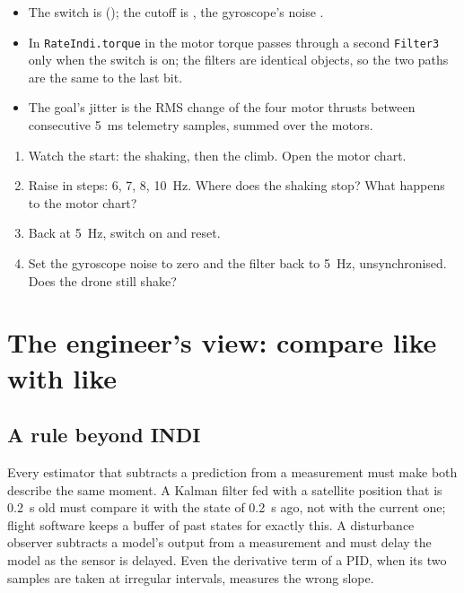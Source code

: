 \begin{inapp}
\begin{itemize}[leftmargin=1.2em]
  \item The switch is  (); the cutoff is , the gyroscope's noise .
  \item In \texttt{RateIndi.torque} in  the motor torque passes through a second \texttt{Filter3} only when the switch is on; the filters are identical objects, so the two paths are the same to the last bit.
  \item The goal's jitter is the RMS change of the four motor thrusts between consecutive \SI{5}{ms} telemetry samples, summed over the motors.
\end{itemize}
\end{inapp}

\begin{trythis}
\begin{enumerate}
  \item Watch the start: the shaking, then the climb. Open the motor chart.
  \item Raise  in steps: 6, 7, 8, \SI{10}{Hz}. Where does the shaking stop? What happens to the motor chart?
  \item Back at \SI{5}{Hz}, switch  on and reset.
  \item Set the gyroscope noise to zero and the filter back to \SI{5}{Hz}, unsynchronised. Does the drone still shake?
\end{enumerate}
\end{trythis}

\section{The engineer's view: compare like with like}

\subsection{A rule beyond INDI}
Every estimator that subtracts a prediction from a measurement must make both describe the same moment. A Kalman filter fed with a satellite position that is \SI{0.2}{s} old must compare it with the state of \SI{0.2}{s} ago, not with the current one; flight software keeps a buffer of past states for exactly this. A disturbance observer subtracts a model's output from a measurement and must delay the model as the sensor is delayed. Even the derivative term of a PID, when its two samples are taken at irregular intervals, measures the wrong slope.

